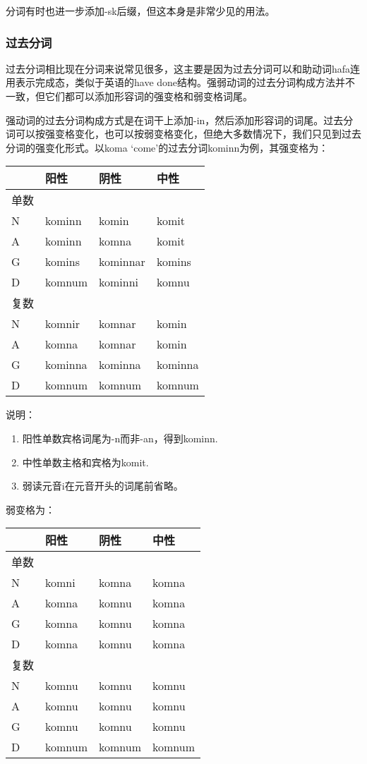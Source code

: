 分词有时也进一步添加-sk后缀，但这本身是非常少见的用法。

\subsubsection{过去分词}\label{ux8fc7ux53bbux5206ux8bcd}

过去分词相比现在分词来说常见很多，这主要是因为过去分词可以和助动词hafa连用表示完成态，类似于英语的have
done结构。强弱动词的过去分词构成方法并不一致，但它们都可以添加形容词的强变格和弱变格词尾。

强动词的过去分词构成方式是在词干上添加-in，然后添加形容词的词尾。过去分词可以按强变格变化，也可以按弱变格变化，但绝大多数情况下，我们只见到过去分词的强变化形式。以koma
`come‌'的过去分词kominn为例，其强变格为：

\begin{longtable}{llll}
\toprule
 & 阳性 & 阴性 & 中性 \\
\midrule
\endhead
\bottomrule
\endfoot
单数 & & & \\
N & kominn & komin & komit \\
A & kominn & komna & komit \\
G & komins & kominnar & komins \\
D & komnum & kominni & komnu \\
复数 & & & \\
N & komnir & komnar & komin \\
A & komna & komnar & komin \\
G & kominna & kominna & kominna \\
D & komnum & komnum & komnum \\
\end{longtable}

说明：

\begin{enumerate}
\def\labelenumi{\arabic{enumi})}
\item
  阳性单数宾格词尾为-n而非-an，得到kominn.
\item
  中性单数主格和宾格为komit.
\item
  弱读元音i在元音开头的词尾前省略。
\end{enumerate}

弱变格为：

\begin{longtable}{llll}
\toprule
 & 阳性 & 阴性 & 中性 \\
\midrule
\endhead
\bottomrule
\endfoot
单数 & & & \\
N & komni & komna & komna \\
A & komna & komnu & komna \\
G & komna & komnu & komna \\
D & komna & komnu & komna \\
复数 & & & \\
N & komnu & komnu & komnu \\
A & komnu & komnu & komnu \\
G & komnu & komnu & komnu \\
D & komnum & komnum & komnum \\
\end{longtable}

